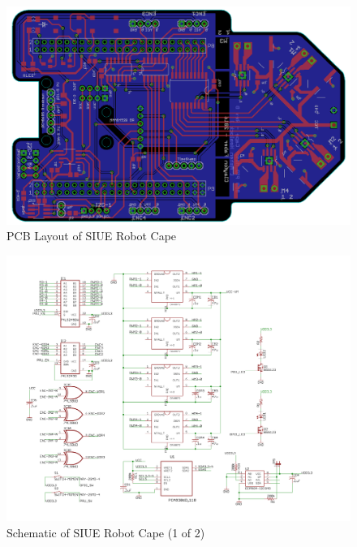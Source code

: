 \documentclass[12pt,oneside,final]{siuethesis}
\theoremstyle{definition}
\begin{document}
\begin{figure}
 \centering
 \includegraphics[scale=.5,keepaspectratio=true]{./images/layout.PNG}
 \caption{PCB Layout of SIUE Robot Cape}
 \label{fig:Layout}
\end{figure}

\begin{figure}
 \centering
 \includegraphics[scale=.25,keepaspectratio=true]{./images/schematic_1.png}
 \caption{Schematic of SIUE Robot Cape (1 of 2)}
 \label{fig:Schematic_1}
\end{figure}
\end{document}
